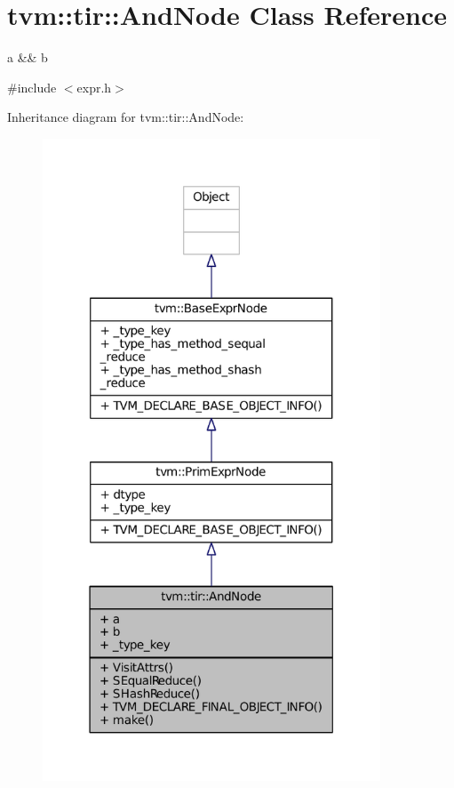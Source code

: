 \hypertarget{classtvm_1_1tir_1_1AndNode}{}\section{tvm\+:\+:tir\+:\+:And\+Node Class Reference}
\label{classtvm_1_1tir_1_1AndNode}


a \&\& b  




{\ttfamily \#include $<$expr.\+h$>$}



Inheritance diagram for tvm\+:\+:tir\+:\+:And\+Node\+:
\nopagebreak
\begin{figure}[H]
\begin{center}
\leavevmode
\includegraphics[width=285pt]{classtvm_1_1tir_1_1AndNode__inherit__graph}
\end{center}
\end{figure}


